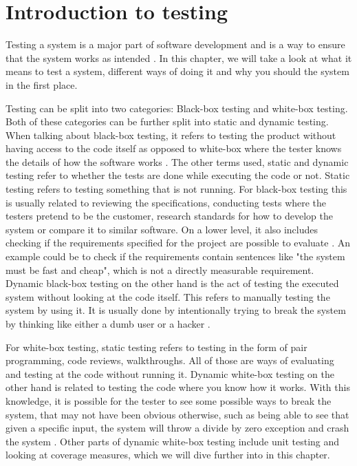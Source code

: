 \section{Introduction to testing}
Testing a system is a major part of software development and is a way to ensure that the system works as intended \cite{SoftwareTesting}.
In this chapter, we will take a look at what it means to test a system, different ways of doing it and why you should the system in the first place.

Testing can be split into two categories: Black-box testing and white-box testing. Both of these categories can be further split into static and dynamic testing.
When talking about black-box testing, it refers to testing the product without having access to the code itself as opposed to white-box where the tester knows the details of how the software works \cite{SoftwareTesting}.
The other terms used, static and dynamic testing refer to whether the tests are done while executing the code or not.
Static testing refers to testing something that is not running. For black-box testing this is usually related to reviewing the specifications, conducting tests where the testers pretend to be the customer, research standards for how to develop the system or compare it to similar software.
On a lower level, it also includes checking if the requirements specified for the project are possible to evaluate \cite{ToVSlides1}.
An example could be to check if the requirements contain sentences like "the system must be fast and cheap", which is not a directly measurable requirement.
Dynamic black-box testing on the other hand is the act of testing the executed system without looking at the code itself. This refers to manually testing the system by using it. It is usually done by intentionally trying to break the system by thinking like either a dumb user or a hacker \cite{SoftwareTesting}.

For white-box testing, static testing refers to testing in the form of pair programming, code reviews, walkthroughs.
All of those are ways of evaluating and testing at the code without running it.
Dynamic white-box testing on the other hand is related to testing the code where you know how it works. With this knowledge, it is possible for the tester to see some possible ways to break the system, that may not have been obvious otherwise, such as being able to see that given a specific input, the system will throw a divide by zero exception and crash the system \cite{ToVSlides1}.
Other parts of dynamic white-box testing include unit testing and looking at coverage measures, which we will dive further into in this chapter.

